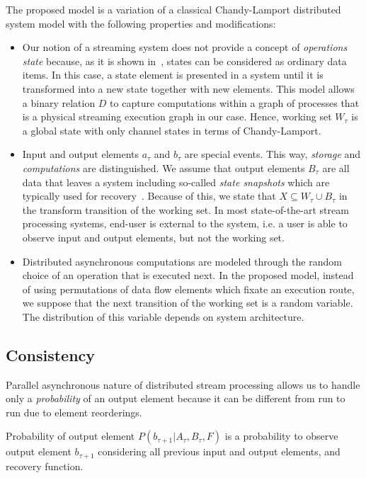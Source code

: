 The proposed model is a variation of a classical Chandy-Lamport distributed system model with the following properties and modifications:

\begin{itemize}
    \item Our notion of a streaming system does not provide a concept of {\em operations state} because, as it is shown in~\cite{we2018adbis}, states can be considered as ordinary data items. In this case, a state element is presented in a system until it is transformed into a new state together with new elements. This model allows a binary relation $D$ to capture computations within a graph of processes that is a physical streaming execution graph in our case. Hence, working set $W_\tau$ is a global state with only channel states in terms of Chandy-Lamport.
    \item Input and output elements $a_\tau$ and $b_\tau$ are special events. This way, {\em storage} and {\em computations} are distinguished. We assume that output elements $B_\tau$ are all data that leaves a system including so-called {\em state snapshots} which are typically used for recovery~\cite{Carbone:2017:SMA:3137765.3137777}. Because of this, we state that $X \subseteq W_\tau \cup B_\tau$ in the transform transition of the working set. In most state-of-the-art stream processing systems, end-user is external to the system, i.e. a user is able to observe input and output elements, but not the working set.
    \item Distributed asynchronous computations are modeled through the random choice of an operation that is executed next. In the proposed model, instead of using permutations of data flow elements which fixate an execution route, we suppose that the next transition of the working set is a random variable. The distribution of this variable depends on system architecture. 
\end{itemize}

\subsection{Consistency}

Parallel asynchronous nature of distributed stream processing allows us to handle only a {\em probability} of an output element because it can be different from run to run due to element reorderings.

\begin{definition}{Probability of output element}
$P(b_{\tau+1}|A_{\tau}, B_\tau, F)$ is a probability to observe output element $b_{\tau+1}$ considering all previous input and output elements, and recovery function.
\end{definition}

